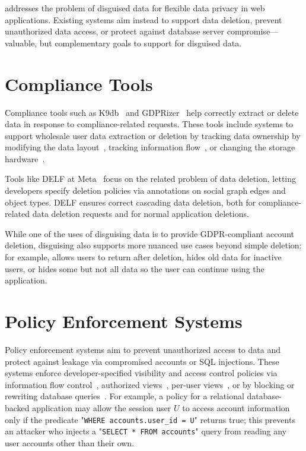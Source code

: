 \sys addresses the problem of disguised data for flexible data privacy in web
applications.
%
Existing systems aim instead to support data deletion, prevent unauthorized data
access, or protect against database server compromise---valuable, but
complementary goals to support for disguised data.%

\section{Compliance Tools}
Compliance tools such as K9db~\cite{k9db} and GDPRizer~\cite{gdprizer} help
correctly extract or delete data in response to compliance-related
requests.
%
These tools include systems to support wholesale user data extraction or deletion by tracking data
ownership by modifying the data layout~\cite{usershards, k9db}, tracking
information flow~\cite{schengendb}, or changing the
storage hardware~\cite{sdp}.
%

%
Tools like DELF at Meta~\cite{delf} focus on the related problem of data
deletion, letting developers specify deletion policies via
annotations on social graph edges and object types. DELF ensures correct
cascading data deletion, both for compliance-related data deletion requests and
for normal application deletions.
%

%
While one of the uses of disguising data is to provide GDPR-compliant account deletion, disguising
also supports more nuanced use cases beyond simple deletion: for example, \sys
allows users to return after deletion, hides old data for inactive users, or
hides some but not all data so the user can continue using the application.
%

\section{Policy Enforcement Systems}
Policy enforcement systems 
aim to prevent unauthorized access to data and protect against leakage via
compromised accounts or SQL injections. 
%
These systems enforce developer-specified
visibility and access control policies via information flow
control~\cite{static, jeeves, jif, hails, ifdb}, authorized views~\cite{oracle},
per-user views~\cite{multiverse}, or by blocking or rewriting database
queries~\cite{blockaid, qapla, sieve}.
%
For example, a policy for a relational database-backed application may allow the
session user $U$ to access account information only if the predicate "\texttt{WHERE
accounts.user\_id = U}" returns true; this prevents an attacker who injects a
"\texttt{SELECT * FROM accounts}" query from reading any user accounts other than their
own.
%

